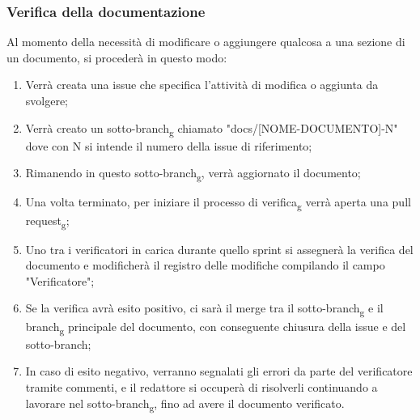 \subsubsection{Verifica della documentazione} Al momento della necessità di modificare o aggiungere qualcosa a una sezione di
un documento, si procederà in questo modo:
\begin{enumerate}
      \item Verrà creata una issue che specifica l'attività di modifica o aggiunta da
            svolgere;
      \item Verrà creato un sotto-branch\textsubscript{g} chiamato
            "docs/[NOME-DOCUMENTO]-N" dove con N si intende il numero della issue di
            riferimento;
      \item Rimanendo in questo sotto-branch\textsubscript{g}, verrà aggiornato il
            documento;
      \item Una volta terminato, per iniziare il processo di verifica\textsubscript{g}
            verrà aperta una pull request\textsubscript{g};
      \item Uno tra i verificatori in carica durante quello sprint si assegnerà la verifica
            del documento e modificherà il registro delle modifiche compilando il campo
            "Verificatore";
      \item Se la verifica avrà esito positivo, ci sarà il merge tra il
            sotto-branch\textsubscript{g} e il branch\textsubscript{g} principale del
            documento, con conseguente chiusura della issue e del sotto-branch;
      \item In caso di esito negativo, verranno segnalati gli errori da parte del
            verificatore tramite commenti, e il redattore si occuperà di risolverli
            continuando a lavorare nel sotto-branch\textsubscript{g}, fino ad avere il
            documento verificato.
\end{enumerate}

